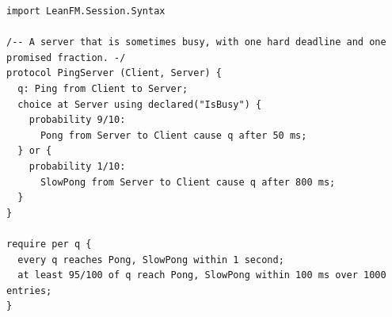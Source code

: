 \begin{lstlisting}[language={},basicstyle=\ttfamily\footnotesize,breaklines=true]
import LeanFM.Session.Syntax

/-- A server that is sometimes busy, with one hard deadline and one promised fraction. -/
protocol PingServer (Client, Server) {
  q: Ping from Client to Server;
  choice at Server using declared("IsBusy") {
    probability 9/10:
      Pong from Server to Client cause q after 50 ms;
  } or {
    probability 1/10:
      SlowPong from Server to Client cause q after 800 ms;
  }
}

require per q {
  every q reaches Pong, SlowPong within 1 second;
  at least 95/100 of q reach Pong, SlowPong within 100 ms over 1000 entries;
}
\end{lstlisting}
